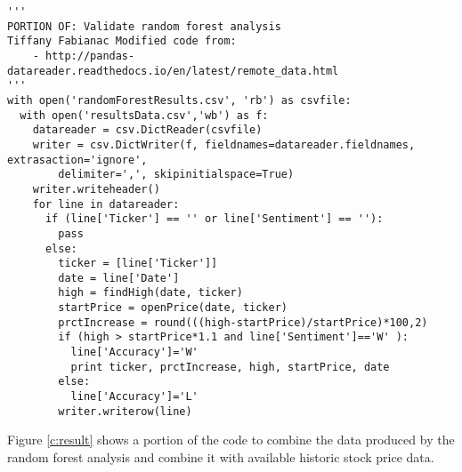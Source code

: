 \documentclass[sigconf]{acmart}
\begin{document}
\begin{figure*}[htb]
\begin{verbatim}
'''
PORTION OF: Validate random forest analysis
Tiffany Fabianac Modified code from:
    - http://pandas-datareader.readthedocs.io/en/latest/remote_data.html
'''
with open('randomForestResults.csv', 'rb') as csvfile:
  with open('resultsData.csv','wb') as f:
    datareader = csv.DictReader(csvfile)
    writer = csv.DictWriter(f, fieldnames=datareader.fieldnames, extrasaction='ignore', 
        delimiter=',', skipinitialspace=True)
    writer.writeheader()
    for line in datareader:
      if (line['Ticker'] == '' or line['Sentiment'] == ''):
        pass
      else:
        ticker = [line['Ticker']]
        date = line['Date']
        high = findHigh(date, ticker)
        startPrice = openPrice(date, ticker)
        prctIncrease = round(((high-startPrice)/startPrice)*100,2)
        if (high > startPrice*1.1 and line['Sentiment']=='W' ):
          line['Accuracy']='W'
          print ticker, prctIncrease, high, startPrice, date
        else:
          line['Accuracy']='L'
        writer.writerow(line)
\end{verbatim}
\caption{This Python script takes in the Date and Stock Ticker Symbol from the sentiment .csv that was produced using the sentiment python script provided for performing a random forest analysis on the Google Alert results. This code returns a modified .csv which lists an ``L'' for stocks that did not increase by 10\% from the time the Alert was received to the current date and a ``W'' for stocks that increased by at least 10\%. It also prints the stocks that increased by at least 10\%  and were marked as ``winners'' by the sentiment script.}\label{c:result}
\end{figure*}

Figure \ref{c:result} shows a portion of the code to combine the data produced by the random forest analysis and combine it with available historic stock price data.
\end{document}

